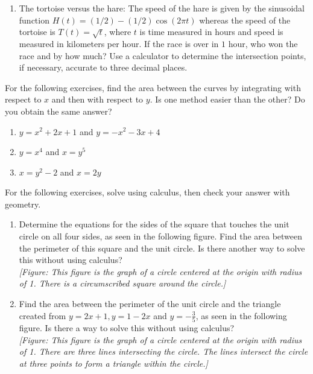 \documentclass{exercises}
\begin{document}
\begin{enumerate}[resume]
\item The tortoise versus the hare: The speed of the hare is given by the sinusoidal function $H(t)=(1/2)-(1/2)\cos(2\pi t)$ whereas the speed of the tortoise is $T(t)=\sqrt{t}$, where $t$ is time measured in hours and speed is measured in kilometers per hour. If the race is over in $1$ hour, who won the race and by how much? Use a calculator to determine the intersection points, if necessary, accurate to three decimal places.
\end{enumerate}

For the following exercises, find the area between the curves by integrating with respect to $x$ and then with respect to $y$. Is one method easier than the other? Do you obtain the same answer?

\begin{enumerate}[resume]
\item $y=x^{2}+2x+1$ and $y=-x^{2}-3x+4$
\item $y=x^{4}$ and $x=y^{5}$
\item $x=y^{2}-2$ and $x=2y$
\end{enumerate}

For the following exercises, solve using calculus, then check your answer with geometry.

\begin{enumerate}[resume]
\item Determine the equations for the sides of the square that touches the unit circle on all four sides, as seen in the following figure. Find the area between the perimeter of this square and the unit circle. Is there another way to solve this without using calculus? \\ \textit{[Figure: This figure is the graph of a circle centered at the origin with radius of 1. There is a circumscribed square around the circle.]}
\item Find the area between the perimeter of the unit circle and the triangle created from $y=2x+1,y=1-2x$ and $y=-\frac{3}{5}$, as seen in the following figure. Is there a way to solve this without using calculus? \\ \textit{[Figure: This figure is the graph of a circle centered at the origin with radius of 1. There are three lines intersecting the circle. The lines intersect the circle at three points to form a triangle within the circle.]}
\end{enumerate}
\end{document}
